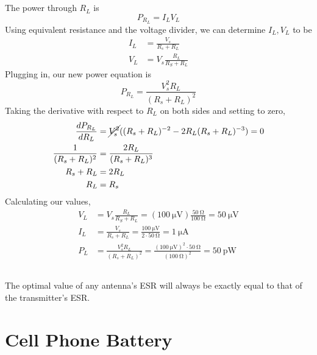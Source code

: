 \documentclass[]{article}
\begin{document}
\subsection{}

The power through \(R_L\) is 
\begin{equation}
	P_{R_L} = I_L V_L
\end{equation}
Using equivalent resistance and the voltage divider, we can determine \(I_L, V_L\) to be
\begin{align}
	I_L &= \frac{V_s}{R_s + R_L} \\
	V_L &= V_s \frac{R_L}{R_S + R_L}
\end{align}
Plugging in, our new power equation is 
\begin{equation}
	P_{R_L} = \frac{V_s^2 R_L}{(R_s + R_L)^2}
\end{equation}
Taking the derivative with respect to \(R_L\) on both sides and setting to zero, 
\begin{align}
	\frac{dP_{R_L}}{dR_L} &= \cancel{V_s^2} ((R_s + R_L)^{-2} - 2R_L(R_s + R_L)^{-3}) = 0 \\
	\frac{1}{(R_s + R_L)^2} &= \frac{2 R_L}{(R_s + R_L)^3} \\
	R_s + R_L &= 2 R_L \\
	R_L &= R_s
\end{align}
Calculating our values, 
\begin{align}
	V_L &= V_s \frac{R_L}{R_S + R_L} = (\SI{100}{\micro\volt}) \frac{50  \ \si{\ohm}}{100 \ \si{\ohm}} = \SI{50}{\micro\volt} \\
	I_L &= \frac{V_s}{R_s + R_L} = \frac{100 \ \si{\micro\volt}}{2 \cdot 50 \ \si{\ohm}} = \SI{1}{\micro\ampere} \\
	P_L &= \frac{V_s^2 R_L}{(R_s + R_L)^2} = \frac{(100 \ \si{\micro\volt})^2 \cdot 50 \ \si{\ohm}}{(100 \ \si{\ohm})^2} = \SI{50}{\pico\watt}
\end{align}

\subsection{}

The optimal value of any antenna's ESR will always be exactly equal to that of the transmitter's ESR. 

\section{Cell Phone Battery}

\subsection{}
\end{document}

